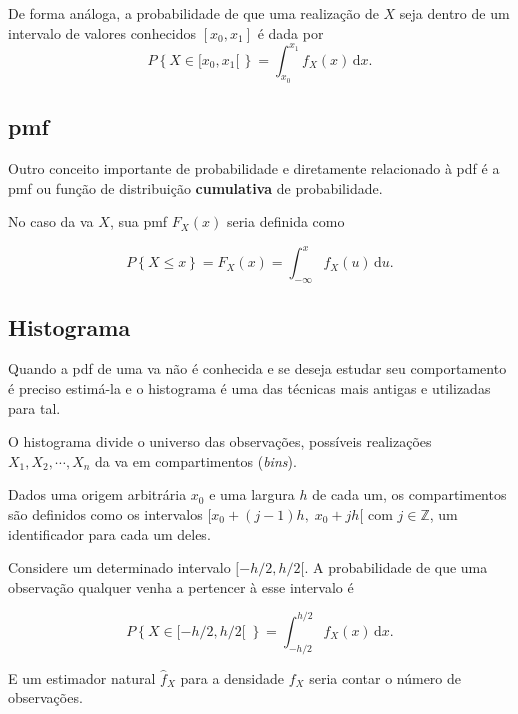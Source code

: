 De forma análoga, a probabilidade de que uma realização de $X$ 
seja dentro de um intervalo de valores conhecidos $[x_0, x_1]$ é dada por
\begin{equation}
	P \left\{ X \in [x_0,x_1[\, \right\} = \int_{x_0}^{x_1}\!f_X(x)\,\mathrm{d}x.
	\label{eq:pdf2}
\end{equation}


\subsection{\Glsdesc{pmf}}
\label{sec:pmf}

Outro conceito importante de probabilidade e diretamente relacionado à \gls{pdf} é a
\gls{pmf} ou função de distribuição \textbf{cumulativa} de probabilidade.

No caso da \gls{va} $X$, sua \gls{pmf} $F_X(x)$ seria definida como

\begin{equation}
	P \left\{ X \leq x\right\} = F_X(x) = \int_{-\infty}^{x}\!f_X(u)\,\mathrm{d}u.
	\label{eq:pmf}
\end{equation}



\subsection{Histograma}
\label{sec:histogram}

Quando a \gls{pdf} de uma \gls{va} não é conhecida e se deseja estudar seu comportamento
é preciso estimá-la e o histograma é uma das técnicas mais antigas e utilizadas para tal.

O histograma divide o universo das observações, possíveis realizações $X_1, X_2,\cdots, X_n$
da \gls{va} em compartimentos (\emph{bins}).

Dados uma origem arbitrária $x_0$ e uma largura $h$ de cada um, os compartimentos
são definidos como os intervalos $[x_0 + (j -1)h,\; x_0 + jh[$ 
com $j\in\mathbb{Z}$, um identificador para cada um deles. 

Considere um determinado intervalo $[-h/2, h/2[$. 
A probabilidade de que uma observação qualquer venha a pertencer à esse intervalo é

\begin{equation}
	P \left\{ X \in [-h/2,h/2[ \; \right\} = \int_{-h/2}^{h/2}\!f_X(x)\,\mathrm{d}x.
	\label{eq:hist01}
\end{equation}

E um estimador natural $\hat{f}_X$ para a densidade $f_X$ seria contar o número de observações.

